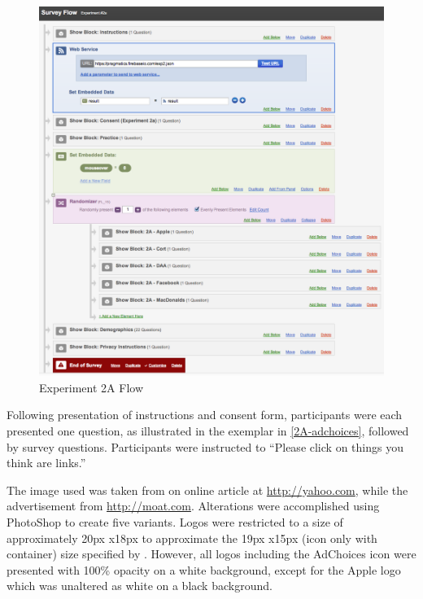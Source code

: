 \begin{figure}
\centerline{
\includegraphics[scale=.3]{chapter6.tex/2a-flow}
}
\caption{Experiment 2A Flow}
\label{2A-flow}
\end{figure}


Following presentation of instructions and consent form, participants were each presented one question, as illustrated in the exemplar in  \autoref{2A-adchoices},  followed by survey questions. Participants were instructed to ``Please click on things you think are links.'' 

The image used was taken from on online article at  \url{http://yahoo.com},  while the advertisement from  \url{http://moat.com}.  Alterations were accomplished using PhotoShop to create five variants. Logos were restricted to a size of approximately 20px x18px to approximate the 19px x15px (icon only with container) size specified by  \cite{Anonymous:2011ur}.  However, all logos including the AdChoices icon were presented with 100\% opacity on a white background, except for the Apple logo which was unaltered as white on a black background.


